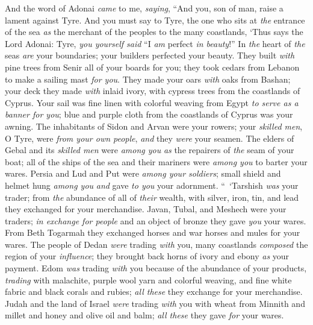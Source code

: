 \begin{biblechapter} %
 And the word of Adonai \textit{came} to me, \textit{saying},
\verse “And you, son of man, raise a lament against Tyre.
\verse And you must say to Tyre, the one who sits at \textit{the} entrance of the sea \textit{as} the merchant of the peoples to the many coastlands, ‘Thus says the Lord Adonai:
\verse Tyre, \textit{you yourself said} 
“I \textit{am} perfect \textit{in beauty}!”
\verse In \textit{the} heart of \textit{the} seas \textit{are} your boundaries; 
your builders perfected your beauty.
\verse They built \textit{with} pine trees from Senir 
all of your boards for you; 
they took cedars from Lebanon 
to make a sailing mast \textit{for you}.
\verse They made your oars 
\textit{with} oaks from Bashan; 
your deck they made \textit{with} inlaid ivory, 
with cypress trees from the coastlands of Cyprus.
\verse Your sail was fine linen with colorful weaving from Egypt 
\textit{to serve as a banner for you}; 
blue and purple cloth from the coastlands of Cyprus 
was your awning.
\verse The inhabitants of Sidon and Arvan 
were your rowers; 
your \textit{skilled men}, O Tyre, were \textit{from your own people}, 
\textit{and} they \textit{were} your seamen.
\verse The elders of Gebal and its \textit{skilled men} were \textit{among you} 
\textit{as} the repairers of \textit{the} seam of your boat; 
all of the ships of the sea and their mariners were \textit{among you} 
to barter your wares.
\verse Persia and Lud and Put 
were \textit{among your soldiers}; 
small shield and helmet hung \textit{among you} 
\textit{and} gave \textit{to you} your adornment.
\verse “ ‘Tarshish \textit{was} your trader; from \textit{the} abundance of all of \textit{their} wealth, with silver, iron, tin, and lead they exchanged for your merchandise.
\verse Javan, Tubal, and Meshech were your traders; \textit{in exchange for people} and an object of bronze they gave \textit{you} your wares.
\verse From Beth Togarmah they exchanged horses and war horses and mules for your wares.
\verse The people of Dedan \textit{were} trading \textit{with} you, many coastlands \textit{composed} the region of your \textit{influence}; they brought back horns of ivory and ebony \textit{as} your payment.
\verse Edom \textit{was} trading \textit{with} you because of the abundance of your products, \textit{trading} with malachite, purple wool yarn and colorful weaving, and fine white fabric and black corals and rubies; \textit{all these} they exchange for your merchandise.
\verse Judah and the land of Israel \textit{were} trading \textit{with} you with wheat from Minnith and millet and honey and olive oil and balm; \textit{all these} they gave \textit{for} your wares.

\end{biblechapter}
